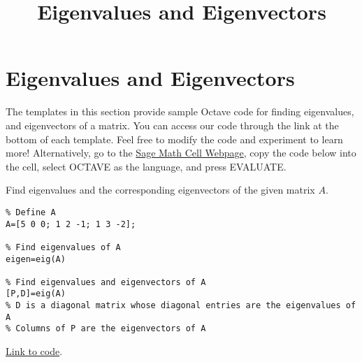 \documentclass{ximera}
\title{Eigenvalues and Eigenvectors} \license{CC BY-NC-SA 4.0}
\begin{document}
\begin{abstract}
\end{abstract}
\maketitle
\section*{Eigenvalues and Eigenvectors}

The templates in this section provide sample Octave code for finding eigenvalues, and eigenvectors of a matrix.  You can access our code through the link at the bottom of each template.  Feel free to modify the code and experiment to learn more!  Alternatively, go to the \href{https://sagecell.sagemath.org/}{Sage Math Cell Webpage}, copy the code below into the cell, select OCTAVE as the language, and press EVALUATE.  

\begin{template}\label{temp:eigen}
Find eigenvalues and the corresponding eigenvectors of the given matrix $A$.

\begin{verbatim}
% Define A
A=[5 0 0; 1 2 -1; 1 3 -2];

% Find eigenvalues of A
eigen=eig(A)

% Find eigenvalues and eigenvectors of A
[P,D]=eig(A)
% D is a diagonal matrix whose diagonal entries are the eigenvalues of A
% Columns of P are the eigenvectors of A 
\end{verbatim}

\href{https://sagecell.sagemath.org/?z=eJx1jkELgkAUhO8L_oe5LBQkqNFJPCxJZ-_iYcmnPtBdWNfq56dCFlGXN8ww32MkcmrYEFQgVFaeECFKESNBGC96RJhUaSACIXFhU4O4JXPT_UQjbLNga5LNd6f2f4p683T11r3Isjjk1UZK5OC5i5p1a43uMWjv-IF7Z0d6p2TmdHnqCL6jH4skzrafBrP64qv4seAJvb5N2g==&lang=octave&interacts=eJyLjgUAARUAuQ==}{Link to code}.
\end{template}
\end{document}
